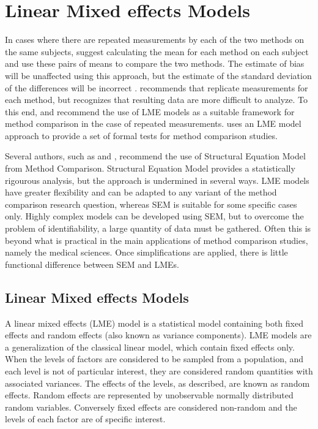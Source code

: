 \documentclass[12pt, a4paper]{report}
\theoremstyle{plain}
\theoremstyle{definition}
\theoremstyle{remark}
\begin{document}
	
	
	
	
			\chapter{Linear Mixed effects Models}
			
			
			In cases where there are repeated measurements by each of the two methods on the same subjects, \citet{BA99} suggest calculating
			the mean for each method on each subject and use these pairs of means to compare the two methods. The estimate of bias will be unaffected using this approach, but the estimate of the standard deviation of the differences will be incorrect \citep{BXC2004}. \citet{BXC2004} recommends that replicate measurements for each method, but recognizes that resulting data are more difficult to analyze. To this end, \citet{BXC2004} and \citet{BXC2008} recommend the use of LME models as a suitable framework for method comparison in the case of repeated measurements.
			\citet{ARoy2009} uses an LME model approach to provide a set of formal tests for method comparison studies.
			
			Several authors, such as \citet{gkelly1985} and \citet{voelkel2005center}, recommend the use of Structural Equation Model from Method Comparison.
			Structural Equation Model provides a statistically rigourous analysis, but the approach is undermined in several ways. LME models have greater flexibility and can be adapted to any variant of the method comparison research question, whereas 
			SEM is suitable for some specific cases only. Highly complex models can be developed using SEM, but to overcome the problem of identifiability, a large quantity of data must be gathered.
			Often this is beyond what is practical in the main applications of method comparison studies, namely the medical sciences. Once simplifications are applied, there is little functional difference between SEM and LMEs.
			
			\section{Linear Mixed effects Models}
			A linear mixed effects (LME) model is a statistical model containing both fixed effects and random effects (also known as variance components). LME models are a generalization of the classical linear model, which contain fixed effects only. When the levels of factors are considered to be sampled from a population,
			and each level is not of particular interest, they are considered random quantities with associated variances.
			The effects of the levels, as described, are known as random effects. Random effects are represented by unobservable
			normally distributed random variables. Conversely fixed effects are considered non-random and the
			levels of each factor are of specific interest.
			
\end{document}
